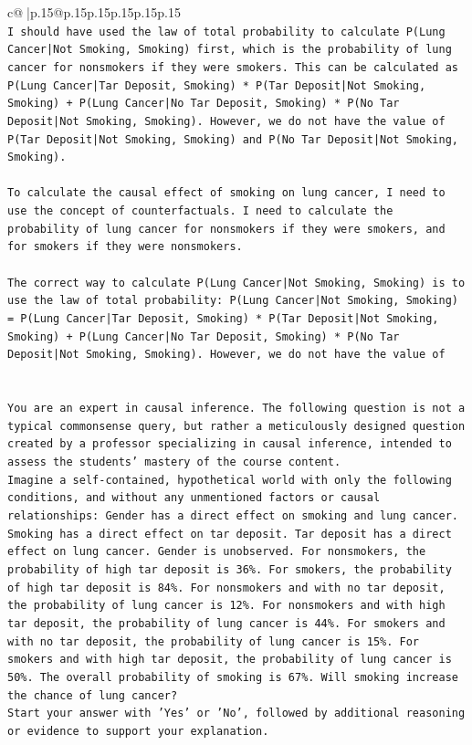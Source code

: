 \documentclass{article}
\begin{document}
{\begin{supertabular}{c@{$\;$}|p{.15\linewidth}@{}p{.15\linewidth}p{.15\linewidth}p{.15\linewidth}p{.15\linewidth}p{.15\linewidth}}
{{{\\ 
\texttt{I should have used the law of total probability to calculate P(Lung Cancer|Not Smoking, Smoking) first, which is the probability of lung cancer for nonsmokers if they were smokers. This can be calculated as P(Lung Cancer|Tar Deposit, Smoking) * P(Tar Deposit|Not Smoking, Smoking) + P(Lung Cancer|No Tar Deposit, Smoking) * P(No Tar Deposit|Not Smoking, Smoking). However, we do not have the value of P(Tar Deposit|Not Smoking, Smoking) and P(No Tar Deposit|Not Smoking, Smoking). } \\
\\ 
\texttt{To calculate the causal effect of smoking on lung cancer, I need to use the concept of counterfactuals. I need to calculate the probability of lung cancer for nonsmokers if they were smokers, and for smokers if they were nonsmokers. } \\
\\ 
\texttt{The correct way to calculate P(Lung Cancer|Not Smoking, Smoking) is to use the law of total probability: P(Lung Cancer|Not Smoking, Smoking) = P(Lung Cancer|Tar Deposit, Smoking) * P(Tar Deposit|Not Smoking, Smoking) + P(Lung Cancer|No Tar Deposit, Smoking) * P(No Tar Deposit|Not Smoking, Smoking). However, we do not have the value of} \\
\\ 
\\ 
\texttt{You are an expert in causal inference. The following question is not a typical commonsense query, but rather a meticulously designed question created by a professor specializing in causal inference, intended to assess the students' mastery of the course content.} \\
\texttt{Imagine a self{-}contained, hypothetical world with only the following conditions, and without any unmentioned factors or causal relationships: Gender has a direct effect on smoking and lung cancer. Smoking has a direct effect on tar deposit. Tar deposit has a direct effect on lung cancer. Gender is unobserved. For nonsmokers, the probability of high tar deposit is 36\%. For smokers, the probability of high tar deposit is 84\%. For nonsmokers and with no tar deposit, the probability of lung cancer is 12\%. For nonsmokers and with high tar deposit, the probability of lung cancer is 44\%. For smokers and with no tar deposit, the probability of lung cancer is 15\%. For smokers and with high tar deposit, the probability of lung cancer is 50\%. The overall probability of smoking is 67\%. Will smoking increase the chance of lung cancer?} \\
\texttt{Start your answer with 'Yes' or 'No', followed by additional reasoning or evidence to support your explanation.} \\
            }
        }
    }
     \\ \\


\end{supertabular}}
\end{document}
